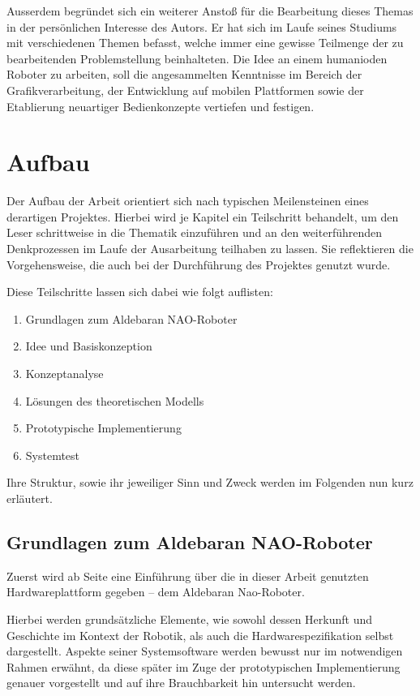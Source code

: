 \documentclass[fontsize=11pt,paper=a4,twoside,openright]{scrreprt}
\begin{document}
Ausserdem begründet sich ein weiterer Anstoß für die Bearbeitung dieses Themas in der persönlichen Interesse des Autors.
Er hat sich im Laufe seines Studiums mit verschiedenen Themen befasst, welche immer eine gewisse Teilmenge der zu bearbeitenden Problemstellung beinhalteten.
Die Idee an einem humanioden Roboter zu arbeiten, soll die angesammelten Kenntnisse im Bereich der Grafikverarbeitung, der Entwicklung auf mobilen Plattformen sowie der Etablierung neuartiger Bedienkonzepte vertiefen und festigen.

\section{Aufbau}
\label{ssec:Aufbau der Arbeit}
Der Aufbau der Arbeit orientiert sich nach typischen Meilensteinen eines derartigen Projektes.
Hierbei wird je Kapitel ein Teilschritt behandelt, um den Leser schrittweise in die Thematik einzuführen und an den weiterführenden Denkprozessen im Laufe der Ausarbeitung teilhaben zu lassen.
Sie reflektieren die Vorgehensweise, die auch bei der Durchführung des Projektes genutzt wurde.

Diese Teilschritte lassen sich dabei wie folgt auflisten:

\begin{enumerate}
	\item Grundlagen zum Aldebaran NAO-Roboter
	\item Idee und Basiskonzeption
	\item Konzeptanalyse
	\item Lösungen des theoretischen Modells
	\item Prototypische Implementierung
	\item Systemtest
\end{enumerate}

Ihre Struktur, sowie ihr jeweiliger Sinn und Zweck werden im Folgenden nun kurz erläutert.

\subsection{Grundlagen zum Aldebaran NAO-Roboter}
\label{sssec:Grundlagen zum Aldebaran NAO-Roboter}

Zuerst wird ab Seite \pageref{sec:Grundlagen zum Aldebaran NAO-Roboter} eine Einführung über die in dieser Arbeit genutzten Hardwareplattform gegeben -- dem Aldebaran Nao-Roboter.

Hierbei werden grundsätzliche Elemente, wie sowohl dessen Herkunft und Geschichte im Kontext der Robotik, als auch die Hardwarespezifikation selbst dargestellt.
Aspekte seiner Systemsoftware werden bewusst nur im notwendigen Rahmen erwähnt, da diese später im Zuge der prototypischen Implementierung genauer vorgestellt und auf ihre Brauchbarkeit hin untersucht werden.
\end{document}
